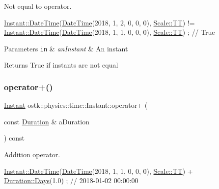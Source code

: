 Not equal to operator. 


\begin{DoxyCode}
\hyperlink{classostk_1_1physics_1_1time_1_1_instant_afd5725574a02389b80fad4baff313c8a}{Instant::DateTime}(\hyperlink{classostk_1_1physics_1_1time_1_1_instant_afd5725574a02389b80fad4baff313c8a}{DateTime}(2018, 1, 2, 0, 0, 0), 
      \hyperlink{namespaceostk_1_1physics_1_1time_adf23d37bd8641fb76a0e98ab46a70df7adf1f3edb9115acb0a1e04209b7a9937b}{Scale::TT}) != \hyperlink{classostk_1_1physics_1_1time_1_1_instant_afd5725574a02389b80fad4baff313c8a}{Instant::DateTime}(\hyperlink{classostk_1_1physics_1_1time_1_1_instant_afd5725574a02389b80fad4baff313c8a}{DateTime}(2018, 1, 1, 0, 0, 0), 
      \hyperlink{namespaceostk_1_1physics_1_1time_adf23d37bd8641fb76a0e98ab46a70df7adf1f3edb9115acb0a1e04209b7a9937b}{Scale::TT}) ; \textcolor{comment}{// True}
\end{DoxyCode}



\begin{DoxyParams}[1]{Parameters}
\mbox{\tt in}  & {\em an\+Instant} & An instant \\
\hline
\end{DoxyParams}
\begin{DoxyReturn}{Returns}
True if instants are not equal 
\end{DoxyReturn}
\mbox{\label{classostk_1_1physics_1_1time_1_1_instant_ae3a88555e64eefbdf9953a5f96e8cb1b}} 
\subsubsection{\texorpdfstring{operator+()}{operator+()}}
{\footnotesize\ttfamily \hyperlink{classostk_1_1physics_1_1time_1_1_instant}{Instant} ostk\+::physics\+::time\+::\+Instant\+::operator+ (\begin{DoxyParamCaption}\item[{const \hyperlink{classostk_1_1physics_1_1time_1_1_duration}{Duration} \&}]{a\+Duration }\end{DoxyParamCaption}) const}



Addition operator. 


\begin{DoxyCode}
\hyperlink{classostk_1_1physics_1_1time_1_1_instant_afd5725574a02389b80fad4baff313c8a}{Instant::DateTime}(\hyperlink{classostk_1_1physics_1_1time_1_1_instant_afd5725574a02389b80fad4baff313c8a}{DateTime}(2018, 1, 1, 0, 0, 0), 
      \hyperlink{namespaceostk_1_1physics_1_1time_adf23d37bd8641fb76a0e98ab46a70df7adf1f3edb9115acb0a1e04209b7a9937b}{Scale::TT}) + \hyperlink{classostk_1_1physics_1_1time_1_1_duration_aefb4abc87c6957d00650228d069fa1e1}{Duration::Days}(1.0) ; \textcolor{comment}{// 2018-01-02 00:00:00}
\end{DoxyCode}



